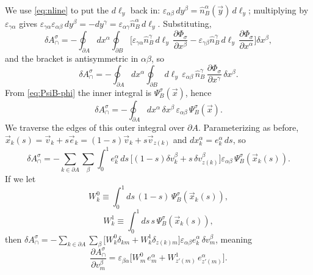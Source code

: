 \documentclass[11pt]{article}
\numberwithin{equation}{section}
\newcommand{\vv}[1]{\vec{#1}}
\newcommand{\eps}{\varepsilon}
\begin{document}
We use \eqref{eq:nline} to put the $d\ell_y$ back in: $\eps_{\alpha\beta}\,dy^\beta=\hat n_B^\alpha(\vv
y)\,d\ell_y$; multiplying by $\eps_{\gamma\alpha}$ gives $\eps_{\gamma\alpha}\eps_{\alpha\beta}\,dy^\beta
=-dy^\gamma=\eps_{\alpha\gamma}\hat n_B^\alpha\,d\ell_y$. Substituting,
\[
  \delta A_\cap^\sigma=-\oint_{\partial A}dx^\alpha\oint_{\partial B}
  \Big[\eps_{\gamma\alpha}\hat n_B^\gamma\,d\ell_y\,\frac{\partial\Phi_\sigma}{\partial x^\beta}
  -\eps_{\gamma\beta}\hat n_B^\gamma\,d\ell_y\,\frac{\partial\Phi_\sigma}{\partial x^\alpha}\Big]
  \delta x^\beta ,
\]
and the bracket is antisymmetric in $\alpha\beta$, so
\begin{equation}\label{eq:dAsig-8p5}
  \delta A_\cap^\sigma=-\oint_{\partial A}dx^\alpha\oint_{\partial B}d\ell_y\,\eps_{\alpha\beta}\,
  \hat n_B^\gamma\,\frac{\partial\Phi_\sigma}{\partial x^\gamma}\,\delta x^\beta .
\end{equation}
From \eqref{eq:PsiB-phi} the inner integral is $\Psi_B^\sigma(\vv x)$, hence
\begin{equation}\label{eq:dAsig-8p6}
  \delta A_\cap^\sigma=-\oint_{\partial A}dx^\alpha\,\delta x^\beta\,\eps_{\alpha\beta}\,
  \Psi_B^\sigma(\vv x).
\end{equation}
We traverse the edges of this outer integral over $\partial A$. Parameterizing as before,
$\vv x_k(s)=\vv v_k+s\vv e_k=(1-s)\vv v_k+s\vv v_{z(k)}$ and $dx_k^\alpha=e_k^\alpha\,ds$, so
\[
  \delta A_\cap^\sigma=-\sum_{k\in\partial A}\sum_\beta\int_0^1 e_k^\alpha\,ds\,
  \big[(1-s)\delta v_k^\beta+s\,\delta v_{z(k)}^\beta\big]\eps_{\alpha\beta}\,\Psi_B^\sigma(\vv x_k(s)).
\]
If we let
\begin{equation}\label{eq:W0}
  W_k^{0}\equiv\int_0^1 ds\,(1-s)\,\Psi_B^\sigma(\vv x_k(s)),
\end{equation}
\begin{equation}\label{eq:W1}
  W_k^{1}\equiv\int_0^1 ds\,s\,\Psi_B^\sigma(\vv x_k(s)),
\end{equation}
then $\delta A_\cap^\sigma=-\sum_{k\in\partial A}\sum_\beta\big[W_k^{0}\delta_{km}
+W_k^{1}\delta_{z(k)m}\big]\eps_{\alpha\beta}e_k^\alpha\,\delta v_m^\beta$, meaning
\begin{equation}\label{eq:gradAsig}
  \frac{\partial A_\cap^\sigma}{\partial v_m^\beta}
  =\eps_{\beta\alpha}\big[W_m^{0}\,e_m^\alpha+W_{z'(m)}^{1}\,e_{z'(m)}^\alpha\big].
\end{equation}
\end{document}
